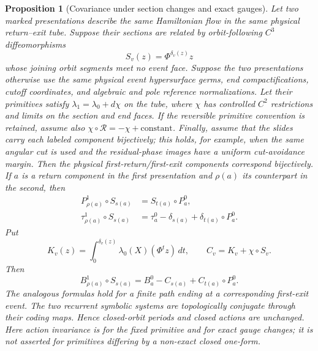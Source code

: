\documentclass[11pt]{amsart}
\numberwithin{equation}{section}
\newtheorem{proposition}[theorem]{Proposition}
\theoremstyle{definition}
\theoremstyle{remark}
\begin{document}
\begin{proposition}[Covariance under section changes and exact gauges]
\label{prop:section-gauge-covariance}
Let two marked presentations describe the same Hamiltonian flow in the
same physical return--exit tube.  Suppose their sections are related by
orbit-following $C^3$ diffeomorphisms
\begin{equation}\label{eq:orbit-slide}
 S_v(z)=\Phi^{\delta_v(z)}z
\end{equation}
whose joining orbit segments meet no event face.  Suppose the two
presentations otherwise use the same physical event hypersurface germs,
end compactifications, cutoff coordinates, and algebraic and pole
reference normalizations.  Let their primitives satisfy
$\lambda_1=\lambda_0+d\chi$ on the tube, where $\chi$ has controlled
$C^2$ restrictions and limits on the section and end faces.  If the
reversible primitive convention is retained, assume also
$\chi\circ\mathcal R=-\chi+\mathrm{constant}$.  Finally, assume that the
slides carry each labeled component bijectively; this holds, for example,
when the same angular cut is used and the residual-phase images have a
uniform cut-avoidance margin.  Then the physical first-return/first-exit
components correspond bijectively.  If
$a$ is a return component in the first presentation and $\rho(a)$ its
counterpart in the second, then
\begin{align}
 P^1_{\rho(a)}\circ S_{s(a)}
 &=S_{t(a)}\circ P^0_a,
 \label{eq:section-conjugacy}\\
 \tau^1_{\rho(a)}\circ S_{s(a)}
 &=\tau^0_a-\delta_{s(a)}+\delta_{t(a)}\circ P^0_a.
 \label{eq:roof-section-coboundary}
\end{align}
Put
\begin{equation}\label{eq:section-action-transfer}
 K_v(z)=\int_0^{\delta_v(z)}
   \lambda_0(X)(\Phi^tz)\,dt,
 \qquad C_v=K_v+\chi\circ S_v.
\end{equation}
Then
\begin{equation}\label{eq:action-section-coboundary}
 B^1_{\rho(a)}\circ S_{s(a)}
 =B^0_a-C_{s(a)}+C_{t(a)}\circ P^0_a.
\end{equation}
The analogous formulas hold for a finite path ending at a corresponding
first-exit event.  The two recurrent symbolic systems are topologically
conjugate through their coding maps.  Hence closed-orbit periods and closed
actions are unchanged.  Here action invariance is for the fixed primitive
and for exact gauge changes; it is not asserted for primitives differing
by a non-exact closed one-form.
\end{proposition}
\end{document}

